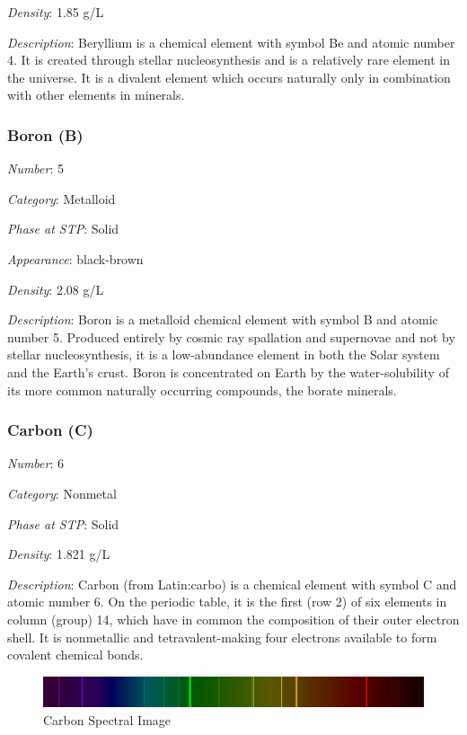 \documentclass{article}
\begin{document}
\textit{Density}: 1.85 g/L

\textit{Description}: Beryllium is a chemical element with symbol Be and atomic number 4. It is created through stellar nucleosynthesis and is a relatively rare element in the universe. It is a divalent element which occurs naturally only in combination with other elements in minerals.

\hypertarget{subsubsection::B}{}\subsubsection{Boron (B)}

\textit{Number}: 5

\textit{Category}: Metalloid

\textit{Phase at STP}: Solid

\textit{Appearance}: black-brown

\textit{Density}: 2.08 g/L

\textit{Description}: Boron is a metalloid chemical element with symbol B and atomic number 5. Produced entirely by cosmic ray spallation and supernovae and not by stellar nucleosynthesis, it is a low-abundance element in both the Solar system and the Earth's crust. Boron is concentrated on Earth by the water-solubility of its more common naturally occurring compounds, the borate minerals.

\hypertarget{subsubsection::C}{}\subsubsection{Carbon (C)}

\textit{Number}: 6

\textit{Category}: Nonmetal

\textit{Phase at STP}: Solid

\textit{Density}: 1.821 g/L

\textit{Description}: Carbon (from Latin:carbo) is a chemical element with symbol C and atomic number 6. On the periodic table, it is the first (row 2) of six elements in column (group) 14, which have in common the composition of their outer electron shell. It is nonmetallic and tetravalent-making four electrons available to form covalent chemical bonds.

\immediate{}
\begin{figure}[!ht]
    \centering
    \includegraphics[width=12cm]{./resources/spectral_img/Carbon_Spectra.jpg}
    \caption{Carbon Spectral Image}
\end{figure}
\end{document}
